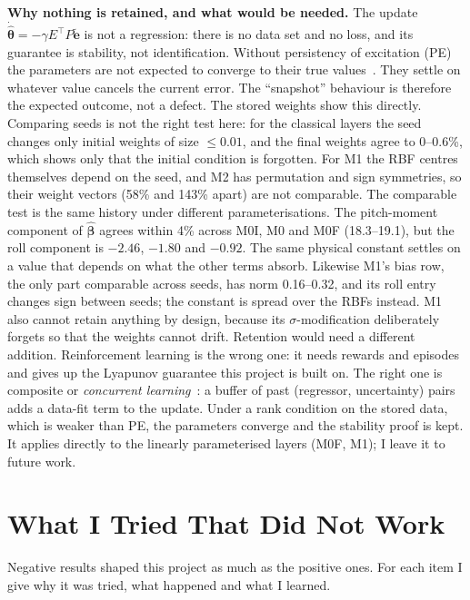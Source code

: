 \documentclass[conference]{IEEEtran}
\newcommand{\thetahat}{\hat{\bm\theta}}
\newcommand{\etilde}{\tilde{\bm e}}
\begin{document}
\textbf{Why nothing is retained, and what would be needed.} The update
$\dot{\thetahat}=-\gamma E^\top P\etilde$ is not a regression: there is
no data set and no loss, and its guarantee is stability, not
identification. Without persistency of excitation (PE) the parameters
are not expected to converge to their true values~\cite{ioannou1996}.
They settle on whatever value cancels the current error. The ``snapshot''
behaviour is therefore the expected outcome, not a defect. The stored
weights show this directly. Comparing seeds is not the right test here:
for the classical layers the seed changes only initial weights of size
$\le0.01$, and the final weights agree to 0--0.6\%, which shows only that
the initial condition is forgotten. For M1 the RBF centres themselves
depend on the seed, and M2 has permutation and sign symmetries, so their
weight vectors (58\% and 143\% apart) are not comparable. The comparable
test is the same history under different parameterisations. The
pitch-moment component of $\hat{\bm\beta}$ agrees within 4\% across
M0I, M0 and M0F (18.3--19.1), but the roll component is $-2.46$, $-1.80$
and $-0.92$. The same physical constant settles on a value that depends
on what the other terms absorb. Likewise M1's bias row, the only part
comparable across seeds, has norm 0.16--0.32, and its roll entry changes
sign between seeds; the constant is spread over the RBFs instead. M1
also cannot retain anything by design, because its $\sigma$-modification
deliberately forgets so that the weights cannot drift. Retention would
need a different addition. Reinforcement learning is the wrong one: it
needs rewards and episodes and gives up the Lyapunov guarantee this
project is built on. The right one is composite or
\emph{concurrent learning}~\cite{chowdhary2010}: a buffer of past
(regressor, uncertainty) pairs adds a data-fit term to the update. Under
a rank condition on the stored data, which is weaker than PE, the
parameters converge and the stability proof is kept. It applies
directly to the linearly parameterised layers (M0F, M1); I leave it to
future work.

\section{What I Tried That Did Not Work}\label{sec:tried}

Negative results shaped this project as much as the positive ones. For
each item I give why it was tried, what happened and what I learned.
\end{document}
